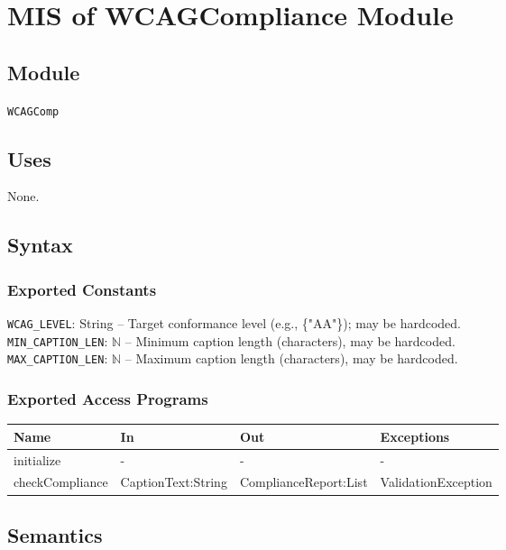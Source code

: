\documentclass[12pt, titlepage]{article}
\begin{document}
\section{MIS of WCAGCompliance Module} \label{wcagc}

\subsection{Module}
\texttt{WCAGComp}

\subsection{Uses}
None.

\subsection{Syntax}

\subsubsection{Exported Constants}
\texttt{WCAG\_LEVEL}: String -- Target conformance level (e.g., \{"AA"\}); may be hardcoded.\\
\texttt{MIN\_CAPTION\_LEN}: $\mathbb{N}$ -- Minimum caption length (characters), may be hardcoded.\\
\texttt{MAX\_CAPTION\_LEN}: $\mathbb{N}$ -- Maximum caption length (characters), may be hardcoded.

\subsubsection{Exported Access Programs} 
\begin{center}
  \begin{tabular}{p{3cm} p{4cm} p{4cm} p{4cm}}
  \hline
  \textbf{Name} & \textbf{In} & \textbf{Out} & \textbf{Exceptions} \\
  \hline
  initialize & - & - & - \\
  \hline
  checkCompliance & CaptionText:String & ComplianceReport:List & ValidationException \\
  \hline
  \end{tabular}
\end{center}

\subsection{Semantics}
\end{document}
